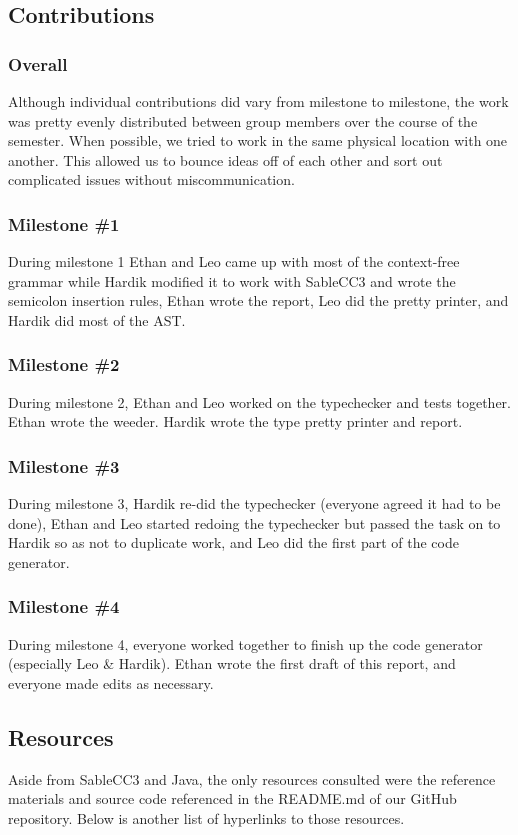 \documentclass{article}
\begin{document}
\subsection{Contributions}
\subsubsection{Overall}
Although individual contributions did vary from milestone to milestone, the work was pretty evenly distributed between group members over the course of the semester. When possible, we tried to work in the same physical location with one another. This allowed us to bounce ideas off of each other and sort out complicated issues without miscommunication.

\subsubsection{Milestone \#1}
During milestone 1 Ethan and Leo came up with most of the context-free grammar while Hardik modified it to work with SableCC3 and wrote the semicolon insertion rules, Ethan wrote the report, Leo did the pretty printer, and Hardik did most of the AST. 

\subsubsection{Milestone \#2}
During milestone 2, Ethan and Leo worked on the typechecker and tests together. Ethan wrote the weeder. Hardik wrote the type pretty printer and report. 

\subsubsection{Milestone \#3}
During milestone 3, Hardik re-did the typechecker (everyone agreed it had to be done), Ethan and Leo started redoing the typechecker but passed the task on to Hardik so as not to duplicate work, and Leo did the first part of the code generator. 

\subsubsection{Milestone \#4}
During milestone 4, everyone worked together to finish up the code generator (especially Leo \& Hardik). Ethan wrote the first draft of this report, and everyone made edits as necessary.


\subsection{Resources}
Aside from SableCC3 and Java, the only resources consulted were the reference materials and source code referenced in the README.md of our GitHub repository. Below is another list of hyperlinks to those resources.
\end{document}
